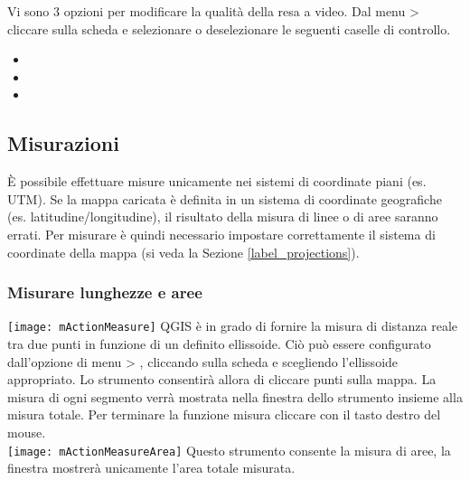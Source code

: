 \label{label_renderquality}

Vi sono 3 opzioni per modificare la qualità della resa a video. Dal menu
 >  cliccare sulla scheda
 e selezionare o deselezionare le seguenti caselle di controllo.
\begin{itemize}
\item {}
\item {}
\item {}
\end{itemize}


\subsection{Misurazioni}\label{sec:measure}

È possibile effettuare misure unicamente nei sistemi di coordinate piani
(es. UTM). Se la mappa caricata è definita in un sistema di coordinate
geografiche (es. latitudine/longitudine), il risultato della misura di linee o
di aree saranno errati. Per misurare è quindi necessario impostare
correttamente il sistema di coordinate della mappa (si veda la Sezione \ref{label_projections}).

\subsubsection{Misurare lunghezze e aree}
\texttt{[image: mActionMeasure]} 
QGIS è in grado di fornire la misura di distanza reale tra due punti in
funzione di un definito ellissoide. Ciò può essere configurato dall'opzione di
menu  > , 
cliccando sulla scheda  e scegliendo l'ellissoide
appropriato. Lo strumento consentirà allora di cliccare punti sulla mappa.
La misura di ogni segmento verrà mostrata nella finestra dello strumento
insieme alla misura totale. Per terminare la funzione misura cliccare con il
tasto destro del mouse. \\
\texttt{[image: mActionMeasureArea]} Questo strumento consente la
misura di aree, la finestra mostrerà unicamente l'area totale misurata.


